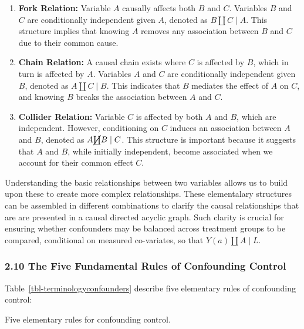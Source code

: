 \documentclass[
  single column]{article}
\providecommand{\tightlist}{%
  \setlength{\itemsep}{0pt}\setlength{\parskip}{0pt}}\usepackage{longtable,booktabs,array}
\begin{document}
\begin{enumerate}
\def\labelenumi{\arabic{enumi}.}
\setcounter{enumi}{2}
\tightlist
\item
  \textbf{Fork Relation:} Variable \(A\) causally affects both \(B\) and
  \(C\). Variables \(B\) and \(C\) are conditionally independent given
  \(A\), denoted as \(B \coprod C \mid A\). This structure implies that
  knowing \(A\) removes any association between \(B\) and \(C\) due to
  their common cause.
\item
  \textbf{Chain Relation:} A causal chain exists where \(C\) is affected
  by \(B\), which in turn is affected by \(A\). Variables \(A\) and
  \(C\) are conditionally independent given \(B\), denoted as
  \(A \coprod C \mid B\). This indicates that \(B\) mediates the effect
  of \(A\) on \(C\), and knowing \(B\) breaks the association between
  \(A\) and \(C\).
\item
  \textbf{Collider Relation:} Variable \(C\) is affected by both \(A\)
  and \(B\), which are independent. However, conditioning on \(C\)
  induces an association between \(A\) and \(B\), denoted as
  \(A \cancel{\coprod} B \mid C\). This structure is important because
  it suggests that \(A\) and \(B\), while initially independent, become
  associated when we account for their common effect \(C\).
\end{enumerate}

Understanding the basic relationships between two variables allows us to
build upon these to create more complex relationships. These
elementalary structures can be assembled in different combinations to
clarify the causal relationships that are are presented in a causal
directed acyclic graph. Such clarity is crucial for ensuring whether
confounders may be balanced across treatment groups to be compared,
conditional on measured co-variates, so that \(Y(a) \coprod A \mid L\).

\newpage{}

\subsubsection{2.10 The Five Fundamental Rules of Confounding
Control}\label{the-five-fundamental-rules-of-confounding-control}

Table~\ref{tbl-terminologyconfounders} describe five elementary rules of
confounding control:

\begin{table}

\caption{\label{tbl-terminologyconfounders}Five elementary rules for
confounding control.}

\centering{

\terminologyelconfounders

}

\end{table}%
\end{document}
